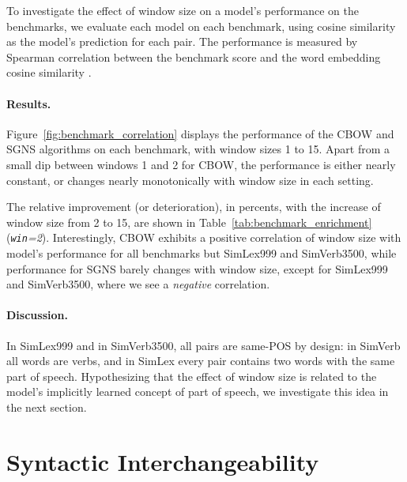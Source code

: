 \documentclass[11pt,a4paper]{article}
\begin{document}
    To investigate the effect of window size on a model's performance on the benchmarks,
    we evaluate each model on each benchmark, using cosine similarity
    as the model's prediction for each pair.
    The performance is measured by Spearman correlation between the benchmark score
    and the word embedding cosine similarity \cite{levy2015improving}.
    
    \paragraph{Results.}
    
    Figure~\ref{fig:benchmark_correlation} displays the performance of the CBOW and SGNS
    algorithms on each benchmark, with window sizes 1 to 15.
    Apart from a small dip between windows 1 and 2 for
    CBOW,
    the performance is either nearly constant,
    or changes nearly monotonically with window size in each setting.
    
    The relative improvement (or deterioration),
    in percents, with the increase of window size from 2 to 15,
    are shown in Table~\ref{tab:benchmark_enrichment} (\textit{\Delta \texttt{win}=2}).
    Interestingly, CBOW exhibits a positive correlation of window size with model's performance
    for all benchmarks but SimLex999 and SimVerb3500,
    while performance for SGNS barely changes with window size,
    except for SimLex999 and SimVerb3500, where we see a \textit{negative} correlation.
    
    \paragraph{Discussion.}
    
    In SimLex999 and in SimVerb3500, all pairs are same-POS by design:
    in SimVerb all words are verbs,
    and in SimLex every pair contains two words with the same part of speech.
    Hypothesizing that the effect of window size is related to the model's
    implicitly learned concept of part of speech, we investigate this idea in the next section.
    
    
    \section{Syntactic Interchangeability}\label{sec:interchangeability}
    
\end{document}
